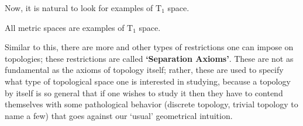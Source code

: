 \noindent Now, it is natural to look for examples of $\mathrm{T}_1$ space.
\begin{Example}
    All metric spaces are examples of $\mathrm{T}_1$ space.
\end{Example}
\noindent Similar to this, there are more and other types of restrictions one can impose on topologies; these restrictions are called \textbf{`Separation Axioms'}. These are not as fundamental as the axioms of topology itself; rather, these are used to specify what type of topological space one is interested in studying, because a topology by itself is so general that if one wishes to study it then they have to contend themselves with some pathological behavior (discrete topology, trivial topology to name a few) that goes against our `usual' geometrical intuition.
\exercise
